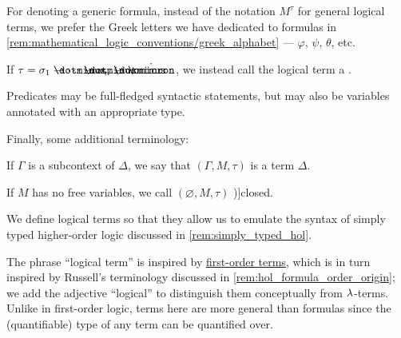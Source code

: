 \begin{definition}
\begin{thmenum}[resume=def:hol_term]
    For denoting a generic formula, instead of the notation \( M^\tau \) for general logical terms, we prefer the Greek letters we have dedicated to formulas in \cref{rem:mathematical_logic_conventions/greek_alphabet} --- \( \varphi \), \( \psi \), \( \theta \), etc.

     If \( \tau = \sigma_1 \synimplies \cdots \synimplies \sigma_n \synimplies \syn\omicron \), we instead call the logical term a .

    Predicates may be full-fledged syntactic statements, but may also be variables annotated with an appropriate type.
  \end{thmenum}

  Finally, some additional terminology:
  \begin{thmenum}[resume=def:hol_term]
     If \( \Gamma \) is a subcontext of \( \Delta \), we say that \( (\Gamma, M, \tau) \) is a term  \( \Delta \).

     If \( M \) has no free variables, we call \( (\varnothing, M, \tau) \) \term[en=closed expression (\cite[270]{Farmer2008STTVirtues})]{closed}.
  \end{thmenum}
\end{definition}
\begin{comments}
  \item We define logical terms so that they allow us to emulate the syntax of simply typed higher-order logic discussed in \cref{rem:simply_typed_hol}.

  \item The phrase \enquote{logical term} is inspired by \hyperref[def:first_order_syntax/term]{first-order terms}, which is in turn inspired by Russell's terminology discussed in \cref{rem:hol_formula_order_origin}; we add the adjective \enquote{logical} to distinguish them conceptually from \( {\mathrm \lambda} \)-terms. Unlike in first-order logic, terms here are more general than formulas since the (quantifiable) type of any term can be quantified over.
\end{comments}

